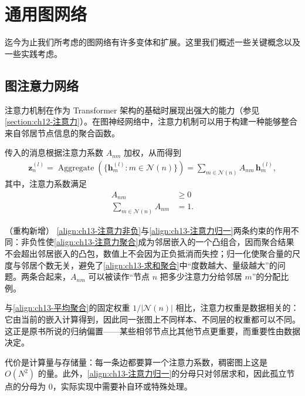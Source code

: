 \documentclass[../../main.tex]{subfiles}
\begin{document}
\section{通用图网络}\label{section:ch13-通用图网络}

迄今为止我们所考虑的图网络有许多变体和扩展。这里我们概述一些关键概念以及一些实践考虑。

\subsection{图注意力网络}\label{subsection:ch13-图注意力网络}

注意力机制在作为 Transformer 架构的基础时展现出强大的能力（参见\cref{section:ch12-注意力}）。在图神经网络中，注意力机制可以用于构建一种能够整合来自邻居节点信息的聚合函数。

\begin{definition}[图注意力网络]\label{definition:ch13-图注意力网络}
传入的消息根据注意力系数 $A_{nm}$ 加权，从而得到
\begin{align}
\bm{z}_n^{(l)}=\operatorname{Aggregate}\!\left(\{\bm{h}_m^{(l)}:m\in\mathcal{N}(n)\}\right)=\sum_{m\in\mathcal{N}(n)}A_{nm}\,\bm{h}_m^{(l)},
\label{align:ch13-注意力聚合}
\end{align}
其中，注意力系数满足
\begin{align}
A_{nm}&\geqslant 0
\label{align:ch13-注意力非负}\\
\sum_{m\in\mathcal{N}(n)}A_{nm}&=1.
\label{align:ch13-注意力归一}
\end{align}
\end{definition}

\begin{remark}（重构新增）
\eqref{align:ch13-注意力非负}与\eqref{align:ch13-注意力归一}两条约束的作用不同：非负性使\eqref{align:ch13-注意力聚合}成为邻居嵌入的一个凸组合，因而聚合结果不会超出邻居嵌入的凸包，数值上不会因为正负抵消而失控；归一化使聚合量的尺度与邻居个数无关，避免了\eqref{align:ch13-求和聚合}中“度数越大、量级越大”的问题。两条合起来，$A_{nm}$ 可以被读作“节点 $n$ 把多少注意力分给邻居 $m$”的分配比例。\par
与\eqref{align:ch13-平均聚合}的固定权重 $1/|\mathcal{N}(n)|$ 相比，注意力权重是数据相关的：它由当前的嵌入计算得到，因此同一张图上不同样本、不同层的权重都可以不同。这正是原书所说的归纳偏置——某些相邻节点比其他节点更重要，而重要性由数据决定。\par
代价是计算量与存储量：每一条边都要算一个注意力系数，稠密图上这是 $O(N^2)$ 的量。此外，\eqref{align:ch13-注意力归一}的分母只对邻居求和，因此孤立节点的分母为 $0$，实际实现中需要补自环或特殊处理。
\end{remark}
\end{document}
